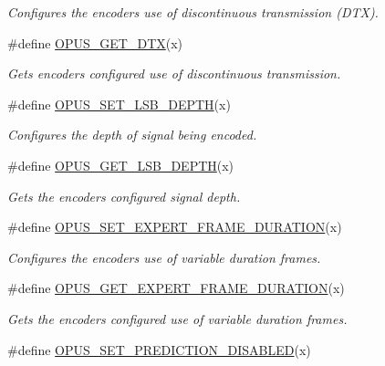 \begin{DoxyCompactItemize}
\begin{DoxyCompactList}\small\item\em Configures the encoder\textquotesingle{}s use of discontinuous transmission (D\+TX). \end{DoxyCompactList}\item 
\#define \hyperlink{group__opus__encoderctls_gaafbb44454e9f57232b85e4e087337ded}{O\+P\+U\+S\+\_\+\+G\+E\+T\+\_\+\+D\+TX}(x)
\begin{DoxyCompactList}\small\item\em Gets encoder\textquotesingle{}s configured use of discontinuous transmission. \end{DoxyCompactList}\item 
\#define \hyperlink{group__opus__encoderctls_gaa23940eb477ff617edc14b8d66e104c0}{O\+P\+U\+S\+\_\+\+S\+E\+T\+\_\+\+L\+S\+B\+\_\+\+D\+E\+P\+TH}(x)
\begin{DoxyCompactList}\small\item\em Configures the depth of signal being encoded. \end{DoxyCompactList}\item 
\#define \hyperlink{group__opus__encoderctls_gab5ecdfbbbabfaefc2f2ca79cf4a3b08f}{O\+P\+U\+S\+\_\+\+G\+E\+T\+\_\+\+L\+S\+B\+\_\+\+D\+E\+P\+TH}(x)
\begin{DoxyCompactList}\small\item\em Gets the encoder\textquotesingle{}s configured signal depth. \end{DoxyCompactList}\item 
\#define \hyperlink{group__opus__encoderctls_gab3764c1b899b2bbe435e1168d3e24b6e}{O\+P\+U\+S\+\_\+\+S\+E\+T\+\_\+\+E\+X\+P\+E\+R\+T\+\_\+\+F\+R\+A\+M\+E\+\_\+\+D\+U\+R\+A\+T\+I\+ON}(x)
\begin{DoxyCompactList}\small\item\em Configures the encoder\textquotesingle{}s use of variable duration frames. \end{DoxyCompactList}\item 
\#define \hyperlink{group__opus__encoderctls_gab22cbb0bccdd29f58a858c0b3c10756a}{O\+P\+U\+S\+\_\+\+G\+E\+T\+\_\+\+E\+X\+P\+E\+R\+T\+\_\+\+F\+R\+A\+M\+E\+\_\+\+D\+U\+R\+A\+T\+I\+ON}(x)
\begin{DoxyCompactList}\small\item\em Gets the encoder\textquotesingle{}s configured use of variable duration frames. \end{DoxyCompactList}\item 
\#define \hyperlink{group__opus__encoderctls_ga0a73d613f6d9d601b32535fd37f58482}{O\+P\+U\+S\+\_\+\+S\+E\+T\+\_\+\+P\+R\+E\+D\+I\+C\+T\+I\+O\+N\+\_\+\+D\+I\+S\+A\+B\+L\+ED}(x)

\end{DoxyCompactItemize}
